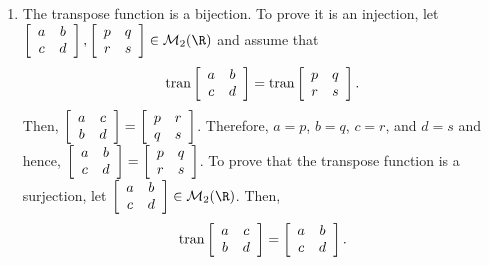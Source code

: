 \documentclass[11pt]{article}
\begin{document}
\begin{enumerate}
\item The transpose function is a bijection.  To prove it is an injection, let 
$\left[ {\begin{array}{*{20}c}
   a & b  \\
   c & d  \\
\end{array} } \right], \left[ {\begin{array}{*{20}c}
   p & q  \\
   r & s  \\
\end{array} } \right] \in \mathcal{M}_2(\R)$ and assume that
\[
\text{tran}\left[ {\begin{array}{*{20}c}
   a & b  \\
   c & d  \\
 \end{array} } \right] = \text{tran}\left[ {\begin{array}{*{20}c}
   p & q  \\
   r & s  \\
 \end{array} } \right].
\]
Then, $\left[ {\begin{array}{*{20}c}
   a & c  \\
   b & d  \\
\end{array} } \right] = \left[ {\begin{array}{*{20}c}
   p & r  \\
   q & s  \\
\end{array} } \right]$.  Therefore, $a = p$, $b = q$, $c = r$, and $d = s$ and hence, 
$\left[ {\begin{array}{*{20}c}
   a & b  \\
   c & d  \\
\end{array} } \right] = \left[ {\begin{array}{*{20}c}
   p & q  \\
   r & s  \\
\end{array} } \right]$.  To prove that the transpose function is a surjection, let 
$\left[ {\begin{array}{*{20}c}
   a & b  \\
   c & d  \\
\end{array} } \right] \in \mathcal{M}_2(\R)$.  Then,
\[
\text{tran}\left[ {\begin{array}{*{20}c}
   a & c  \\
   b & d  \\
 \end{array} } \right] = \left[ {\begin{array}{*{20}c}
   a & b  \\
   c & d  \\
 \end{array} } \right].
\]


\end{enumerate}
\end{document}
